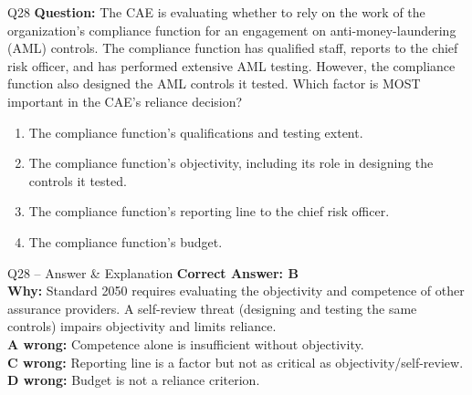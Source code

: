 \documentclass[aspectratio=169,10pt]{beamer}
\begin{document}
	\begin{frame}[t]{Q28}
		\small
		\textbf{Question:} The CAE is evaluating whether to rely on the work of the organization's compliance function for an engagement on anti-money-laundering (AML) controls. The compliance function has qualified staff, reports to the chief risk officer, and has performed extensive AML testing. However, the compliance function also designed the AML controls it tested. Which factor is MOST important in the CAE's reliance decision?
		\begin{enumerate}[label=\Alph*.,itemsep=1pt,topsep=2pt]
			\item The compliance function's qualifications and testing extent.
			\item The compliance function's objectivity, including its role in designing the controls it tested.
			\item The compliance function's reporting line to the chief risk officer.
			\item The compliance function's budget.
		\end{enumerate}
	\end{frame}
	
	\begin{frame}[t]{Q28 -- Answer \& Explanation}
		\small
		\textbf{Correct Answer: B} \\[4pt]
		\textbf{Why:} Standard 2050 requires evaluating the objectivity and competence of other assurance providers. A self-review threat (designing and testing the same controls) impairs objectivity and limits reliance. \\[4pt]
		\textbf{A wrong:} Competence alone is insufficient without objectivity. \\[2pt]
		\textbf{C wrong:} Reporting line is a factor but not as critical as objectivity/self-review. \\[2pt]
		\textbf{D wrong:} Budget is not a reliance criterion.
	\end{frame}
	
\end{document}
